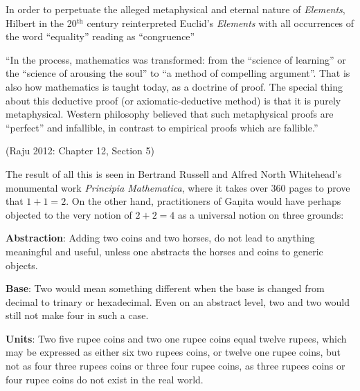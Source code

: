 In order to perpetuate the alleged metaphysical and eternal nature of {\sl Elements}, Hilbert in the 20$^{\text{th}}$ century reinterpreted Euclid’s {\sl Elements} with all occurrences of the word ``equality'' reading as ``congruence''

\begin{myquote}
``In the process, mathematics was transformed: from the ``science of learning'' or the ``science of arousing the soul'' to ``a method of compelling argument''. That is also how mathematics is taught today, as a doctrine of proof. The special thing about this deductive proof (or axiomatic-deductive method) is that it is purely metaphysical. Western philosophy believed that such metaphysical proofs are ``perfect'' and infallible, in contrast to empirical proofs which are fallible.''

\hfill 	(Raju 2012: Chapter 12, Section 5)
\end{myquote}

The result of all this is seen in Bertrand Russell and Alfred North Whitehead's monumental work {\sl Principia Mathematica}, where it takes over 360 pages to prove that $1 + 1 = 2$. On the other hand, practitioners of Gaṇita would have perhaps objected to the very notion of $2 + 2 =4$ as a universal notion on three grounds:

{{\bf Abstraction}}: Adding two coins and two horses, do not lead to anything meaningful and useful, unless one abstracts the horses and coins to generic objects.

{{\bf Base}}: Two would mean something different when the base is changed from decimal to trinary or hexadecimal. Even on an abstract level, two and two would still not make four in such a case.

{{\bf Units}}: Two five rupee coins and two one rupee coins equal twelve rupees, which may be expressed as either six two rupees coins, or twelve one rupee coins, but not as four three rupees coins or three four rupee coins, as three rupees coins or four rupee coins do not exist in the real world.

